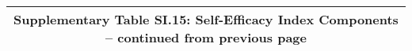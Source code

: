 \begin{longtable}{llcccccccccc}
\multicolumn{12}{c}{{\bfseries Supplementary Table SI.15: Self-Efficacy Index Components -- continued from previous page}} \\ \hline                                                                                                                                                                                                                                                                                                                                                                                                                                                                                                                                                                                                                                                                                                                                                      

\end{longtable}

